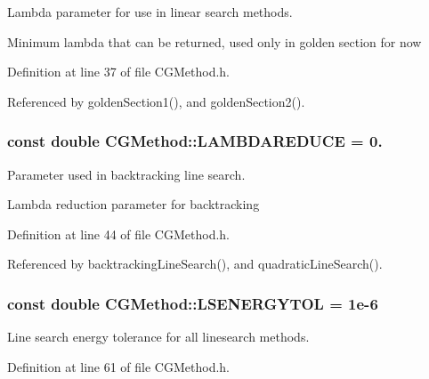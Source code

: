 Lambda parameter for use in linear search methods. 

Minimum lambda that can be returned, used only in golden section for now 

Definition at line 37 of file C\+G\+Method.\+h.



Referenced by golden\+Section1(), and golden\+Section2().

\hypertarget{classCGMethod_a0fa651bde0efa2e195ec6a367a0e346e}{
\subsubsection[{L\+A\+M\+B\+D\+A\+R\+E\+D\+U\+C\+E}]{\setlength{\rightskip}{0pt plus 5cm}const double C\+G\+Method\+::\+L\+A\+M\+B\+D\+A\+R\+E\+D\+U\+C\+E = 0.\hspace{0.3cm}{\ttfamily [protected]}}}\label{classCGMethod_a0fa651bde0efa2e195ec6a367a0e346e}


Parameter used in backtracking line search. 

Lambda reduction parameter for backtracking 

Definition at line 44 of file C\+G\+Method.\+h.



Referenced by backtracking\+Line\+Search(), and quadratic\+Line\+Search().

\hypertarget{classCGMethod_a084794992bdcec9285f6512b56e6c578}{
\subsubsection[{L\+S\+E\+N\+E\+R\+G\+Y\+T\+O\+L}]{\setlength{\rightskip}{0pt plus 5cm}const double C\+G\+Method\+::\+L\+S\+E\+N\+E\+R\+G\+Y\+T\+O\+L = 1e-\/6\hspace{0.3cm}{\ttfamily [protected]}}}\label{classCGMethod_a084794992bdcec9285f6512b56e6c578}


Line search energy tolerance for all linesearch methods. 



Definition at line 61 of file C\+G\+Method.\+h.



